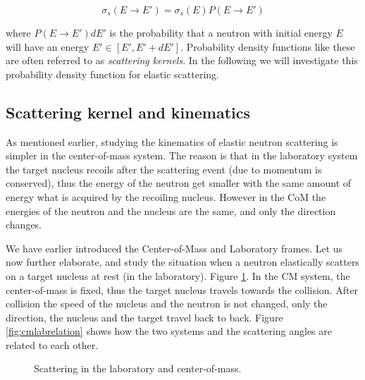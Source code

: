 $$\sigma_s(E\rightarrow E')=\sigma_s(E)P(E\rightarrow E')$$

\noindent where $P(E\rightarrow E')dE'$ is the probability that a neutron with initial energy $E$ will have an energy $E' \in [E',E'+dE']$. Probability density functions like these are often referred to as \textit{scattering kernels}. In the following we will investigate this probability density function for elastic scattering.

\subsection{Scattering kernel and kinematics}

As mentioned earlier, studying the kinematics of elastic neutron scattering is simpler in the center-of-mass system. The reason is that in the laboratory system the target nucleus recoils after the scattering event (due to momentum is conserved), thus the energy of the neutron get smaller with the same amount of energy what is acquired by the recoiling nucleus. However in the CoM the energies of the neutron and the nucleus are the same, and only the direction changes. 

We have earlier introduced the Center-of-Mass and Laboratory frames. Let us now further elaborate, and study the situation when a neutron elastically scatters on a target nucleus at rest (in the laboratory). Figure \ref{fig:cmlabscatter}. In the CM system, the center-of-mass is fixed, thus the target nucleus travels towards the collision. After collision the speed of the nucleus and the neutron is not changed, only the direction, the nucleus and the target travel back to back. Figure \ref{fig:cmlabrelation} shows how the two systems and the scattering angles are related to each other.

\begin{figure}[ht!]
\protect {}\protect
\caption{\label{fig:cmlabscatter} \footnotesize{Scattering in the laboratory and center-of-mass.}}
\end{figure}


